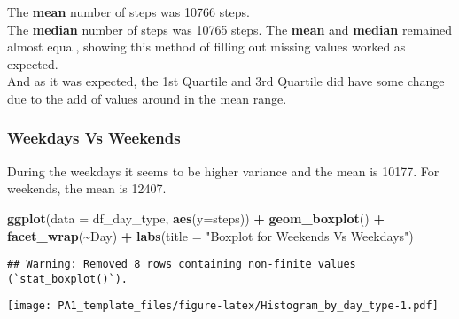 \documentclass[
]{article}
\newenvironment{Shaded}{\begin{snugshade}}{\end{snugshade}}
\newcommand{\AttributeTok}[1]{\textcolor[rgb]{0.13,0.29,0.53}{#1}}
\newcommand{\FunctionTok}[1]{\textcolor[rgb]{0.13,0.29,0.53}{\textbf{#1}}}
\newcommand{\NormalTok}[1]{#1}
\newcommand{\SpecialCharTok}[1]{\textcolor[rgb]{0.81,0.36,0.00}{\textbf{#1}}}
\newcommand{\StringTok}[1]{\textcolor[rgb]{0.31,0.60,0.02}{#1}}
\begin{document}
The \textbf{mean} number of steps was 10766 steps.\\
The \textbf{median} number of steps was 10765 steps. The \textbf{mean}
and \textbf{median} remained almost equal, showing this method of
filling out missing values worked as expected.\\
And as it was expected, the 1st Quartile and 3rd Quartile did have some
change due to the add of values around in the mean range.

\hypertarget{weekdays-vs-weekends}{%
\subsubsection{Weekdays Vs Weekends}\label{weekdays-vs-weekends}}

During the weekdays it seems to be higher variance and the mean is
10177. For weekends, the mean is 12407.

\begin{Shaded}
\begin{Highlighting}[]
\FunctionTok{ggplot}\NormalTok{(}\AttributeTok{data =}\NormalTok{ df\_day\_type, }\FunctionTok{aes}\NormalTok{(}\AttributeTok{y=}\NormalTok{steps)) }\SpecialCharTok{+}
  \FunctionTok{geom\_boxplot}\NormalTok{() }\SpecialCharTok{+}
  \FunctionTok{facet\_wrap}\NormalTok{(}\SpecialCharTok{\textasciitilde{}}\NormalTok{Day) }\SpecialCharTok{+}
  \FunctionTok{labs}\NormalTok{(}\AttributeTok{title =} \StringTok{"Boxplot for Weekends Vs Weekdays"}\NormalTok{)}
\end{Highlighting}
\end{Shaded}

\begin{verbatim}
## Warning: Removed 8 rows containing non-finite values (`stat_boxplot()`).
\end{verbatim}

\texttt{[image: PA1\_template\_files/figure-latex/Histogram\_by\_day\_type-1.pdf]}
\end{document}
